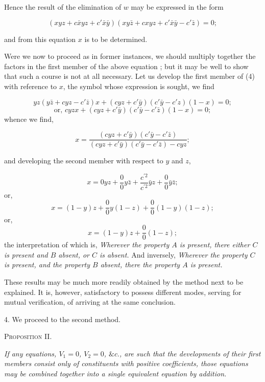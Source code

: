\documentclass[oneside]{book}
\begin{document}
Hence the result of the elimination of $w$ may be expressed in the
form

\begin{equation}
(xyz + c\bar{x}yz + c'\bar{x}\bar{y}) (xy\bar{z} + cxyz + c'\bar{x}\bar{y} - c'\bar{z}) = 0;
\end{equation}

and from this equation $x$ is to be determined.

Were we now to proceed as in former instances, we should
multiply together the factors in the first member of the above
equation ; but it may be well to show that such a course is not
at all necessary. Let us develop the first member of (4) with
reference to $x$, the symbol whose expression is sought, we find

\[
yz (y\bar{z} + cyz - c'\bar{z}) x + (cyz + c'\bar{y}) (c'\bar{y} - c'{z}) (1 - x) = 0;
\]
\[
\textrm{or, }cyzx + (cyz + c'\bar{y}) (c'\bar{y} - c'\bar{z}) (1 - x) = 0;
\]
whence we find,

\[
x =\frac{(cyz + c'\bar{y}) (c'\bar{y} - c'\bar{z})}{(cyz + c'\bar{y}) (c'\bar{y} - c'\bar{z}) - cyz};
\]

and developing the second member with respect to $y$ and $z$,

\[
x=0yz+\frac{0}{0}y\bar{z}+\frac{c^{\prime 2}}{c^{\prime 2}}\bar{y}z+\frac{0}{0}\bar{y}\bar{z};
\]
or,
\[
x=\left(1-y\right)z+\frac{0}{0}y\left(1-z\right)+\frac{0}{0}\left(1-y\right)\left(1-z\right);
\]
or,
\[
x=\left(1-y\right)z+\frac{0}{0}\left(1-z\right);
\]
the interpretation of which is, \textit{Wherever the property $A$ is present,
there either $C$ is present and $B$ absent, or $C$ is absent.} And inversely,
\textit{Wherever the property $C$ is present, and the property $B$
absent, there the property $A$ is present.}

These results may be much more readily obtained by the
method next to be explained. It is, however, satisfactory to
possess different modes, serving for mutual verification, of arriving
at the same conclusion.

4. We proceed to the second method.

\begin{center}
\textsc{Proposition II.}
\end{center}

\textit{If any equations, $V_1=0$, $V_2=0$, $\&c.$, are such that the developments
of their first members consist only of constituents with positive
coefficients, those equations may be combined together into a single
equivalent equation by addition.}
\end{document}
